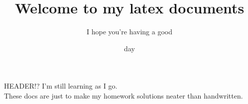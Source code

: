 \documentclass{article}
\title{Welcome to my latex documents}
\author{I hope you're having a good}
\date{day}
\begin{document}
\maketitle
\begin{section} {HEADER!?}
    I'm still learning as I go. \\
    These docs are just to make my homework solutions neater than handwritten.
\end{section}
\end{document}
